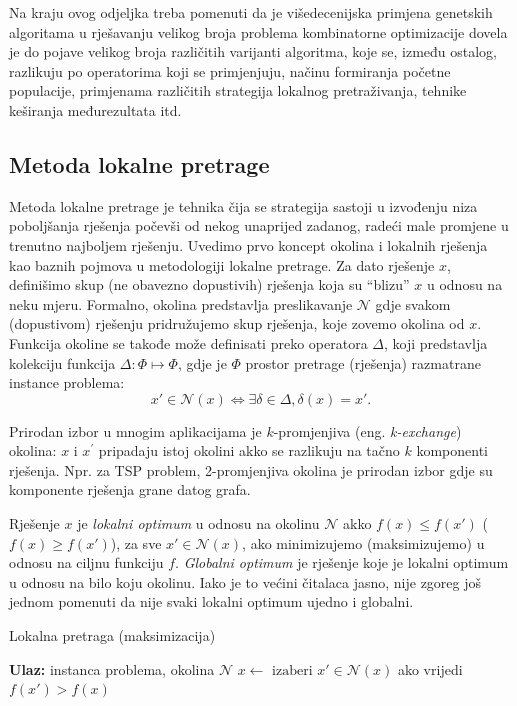 \documentclass[a4paper, utf8, 11pt, colorlinks]{book}
\theoremstyle{definition}
\begin{document}
Na kraju ovog odjeljka treba pomenuti da je višedecenijska primjena genetskih algoritama u rješavanju velikog broja problema kombinatorne optimizacije dovela je do pojave velikog broja različitih varijanti algoritma, koje se, između ostalog, razlikuju po operatorima koji se primjenjuju, načinu formiranja početne populacije, primjenama različitih strategija lokalnog pretraživanja, tehnike keširanja međurezultata itd. 

 
\subsection{Metoda lokalne pretrage}\label{sec: local_search}

Metoda lokalne pretrage je tehnika čija se strategija sastoji u izvođenju niza poboljšanja  rješenja počevši od nekog unaprijed zadanog, radeći male promjene u trenutno najboljem rješenju. Uvedimo prvo koncept okolina i lokalnih rješenja kao baznih pojmova u metodologiji lokalne pretrage. Za dato rješenje $x$, definišimo skup (ne obavezno dopustivih) rješenja koja su ``blizu'' $x$ u odnosu na neku mjeru. Formalno, okolina predstavlja preslikavanje  $\mathcal{N}$ gdje svakom (dopustivom) rješenju pridružujemo skup rješenja, koje zovemo okolina od $x$.  Funkcija okoline se takođe može definisati preko operatora  $\Delta$, koji predstavlja kolekciju   funkcija $\Delta:\Phi \mapsto \Phi$,  gdje je $\Phi$ prostor pretrage (rješenja) razmatrane instance problema:
$$ x' \in \mathcal{N}(x) \Longleftrightarrow \exists \delta \in \Delta,\delta(x)=x'.$$
 
Prirodan izbor u mnogim aplikacijama je $k$-promjenjiva (eng. \emph{k-exchange}) okolina: $x$ i $x^{'}$ pripadaju istoj okolini akko se razlikuju na tačno $k$ komponenti rješenja. Npr. za TSP problem, 2-{promjenjiva} okolina je prirodan izbor gdje su komponente rješenja grane datog grafa.  

  
Rješenje $x$ je \emph{lokalni optimum} u odnosu na okolinu $\mathcal{N}$ akko
$f(x) \leq f(x')$ ($f(x) \geq f(x')$), za sve $x' \in \mathcal{N}(x)$, ako minimizujemo (maksimizujemo) u odnosu na ciljnu funkciju $f$.  \emph{Globalni optimum} je rješenje koje je lokalni optimum u odnosu na bilo koju okolinu.  Iako je to većini čitalaca jasno, nije zgoreg  još jednom pomenuti da nije svaki lokalni optimum ujedno i globalni. 

\begin{algorithm}[!t] 
	\caption{Lokalna pretraga (maksimizacija)}\label{alg:ls}
	\begin{algorithmic}[1]
		\STATE \textbf{Ulaz:} instanca problema, okolina $\mathcal{N}$
		\STATE $ x \gets  \text{ izaberi } x' \in \mathcal{N}(x) $ ako vrijedi  $f(x') > f(x)$ 
		\ENDWHILE
	\end{algorithmic}
\end{algorithm}
\end{document}
